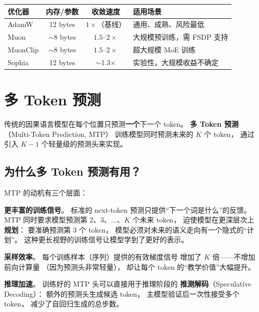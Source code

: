 \begin{keybox}[优化器选择指南（2026 年）]
\begin{center}\small
\renewcommand{\arraystretch}{1.3}
\begin{tabular}{lccl}
  \toprule
  \rowcolor{figLightGray}
  \textbf{优化器} & \textbf{内存/参数} & \textbf{收敛速度}
  & \textbf{适用场景} \\
  \midrule
  AdamW & 12 bytes & $1\times$（基线） & 通用、成熟、风险最低 \\
  Muon & $\sim$8 bytes & $1.5$--$2\times$ & 大规模预训练，需 FSDP 支持 \\
  MuonClip & $\sim$8 bytes & $1.5$--$2\times$ & 超大规模 MoE 训练 \\
  Sophia & 12 bytes & $\sim$1.3$\times$ & 实验性，大规模收益不确定 \\
  \bottomrule
\end{tabular}
\end{center}
\end{keybox}

\section{多 Token 预测}
\label{sec:mtp}

传统的因果语言模型在每个位置只预测\textbf{一个}下一个 token。
\textbf{多 Token 预测}（Multi-Token Prediction, MTP）%
训练模型同时预测未来的 $K$ 个 token，
通过引入 $K-1$ 个轻量级的预测头来实现。

\subsection{为什么多 Token 预测有用？}

MTP 的动机有三个层面：

\textbf{更丰富的训练信号}。
标准的 next-token 预测只提供“下一个词是什么”的反馈。
MTP 同时要求模型预测第 2、3、...、$K$ 个未来 token，
迫使模型在更深层次上\textbf{规划}：
要准确预测第 3 个 token，
模型必须对未来的语义走向有一个隐式的“计划”。
这种更长视野的训练信号让模型学到了更好的表示。

\textbf{采样效率}。
每个训练样本（序列）提供的有效梯度信号
增加了 $K$ 倍——不增加前向计算量
（因为预测头非常轻量），
却让每个 token 的“教学价值”大幅提升。

\textbf{推理加速}。
训练好的 MTP 头可以直接用于推理阶段的
\textbf{推测解码}（Speculative Decoding）：
额外的预测头生成候选 token，
主模型验证后一次性接受多个 token，
减少了自回归生成的总步数。

